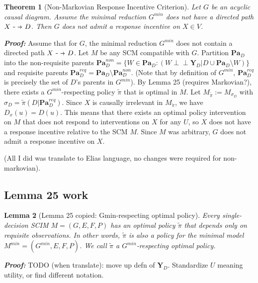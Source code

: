 \documentclass[letterpaper,10pt]{article}
\newtheorem{theorem}{Theorem}
\newtheorem{lemma}[theorem]{Lemma}
\newcommand\dashto{\mathrel{
  -\mkern-6mu{\to}\mkern-20mu{\color{white}\bullet}\mkern12mu
}}
\newcommand\indep{\perp \!\!\! \perp}
\begin{document}
\begin{theorem}[Non-Markovian Response Incentive Criterion]\label{nonmarkov}
Let $G$ be an acyclic causal diagram. Assume the minimal reduction $G^{min}$ does not have a directed path $X\dashto D$.
Then $G$ does not admit a response incentive on $X\in V$.
\end{theorem}

\textbf{\emph{Proof:}}
Assume that for $G$, the minimal reduction $G^{min}$ does not contain a directed path $X\dashto D$.
Let $M$ be any SCM compatible with $G$. 
Partition $\mathbf{Pa}_D$ into the non-requisite parents $\mathbf{Pa}^{non}_D=\{W\in \mathbf{Pa}_D : (W\indep \mathbf{Y}_D | D \cup \mathbf{Pa}_D \setminus W)\}$ and requisite parents $\mathbf{Pa}_D^{req}=\mathbf{Pa}_D\setminus\mathbf{Pa}^{non}_D$.
(Note that by definition of $G^{min}$, $\mathbf{Pa}_D^{req}$ is precisely the set of $D$'s parents in $G^{min}$).
By Lemma 25 \color{red} (requires Markovian?)\color{black}, there exists a $G^{min}$-respecting policy $\tilde{\pi}$ that is optimal in $M$. 
Let $M_{\tilde{\pi}}:=M_{\sigma_D}$ with $\sigma_D = \tilde{\pi} (D|\mathbf{Pa}^{req}_D)$.
Since $X$ is causally irrelevant in $M_{\tilde{\pi}}$, we have $D_x(u) = D(u)$. 
This means that there exists an optimal policy intervention on $M$ that does not respond to interventions on $X$ for any $U$, so $X$ does not have a response incentive relative to the SCM $M$. 
Since $M$ was arbitrary, $G$ does not admit a response incentive on $X$.

\color{red} (All I did was translate to Elias language, no changes were required for non-markovian). \color{black}


\subsection{Lemma 25 work}

\begin{lemma}[Lemma 25 copied: Gmin-respecting optimal policy]\label{lemma25:copy}
Every single-decision SCIM $M=(G,E,F,P)$ has an optimal policy $\tilde{\pi}$ that depends only on requisite observations. In other words, $\tilde{\pi}$ is also a policy for the minimal model $M^{min}=(G^{min},E,F,P)$. We call $\tilde{\pi}$ a $G^{min}$-respecting optimal policy.
\end{lemma}

\textbf{\emph{Proof:}}
\color{red} TODO (when translate): move up defn of $\mathbf{Y}_D$. Standardize $U$ meaning utility, or find different notation. \color{black}
\end{document}
